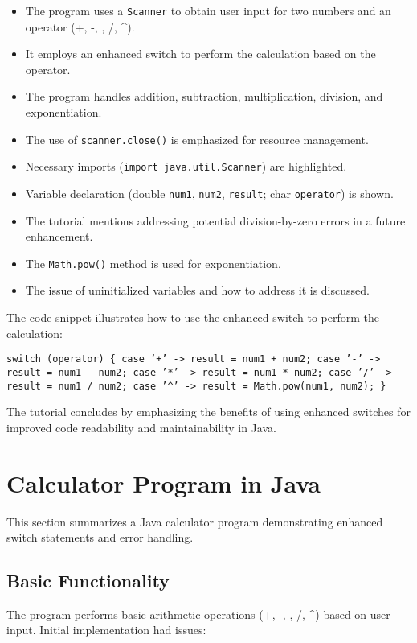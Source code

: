 \documentclass{article}
\begin{document}
\begin{itemize}
    \item The program uses a \texttt{Scanner} to obtain user input for two numbers and an operator (+, -, \*, /, \textasciicircum{}).
    \item It employs an enhanced switch to perform the calculation based on the operator.
    \item The program handles addition, subtraction, multiplication, division, and exponentiation.
    \item  The use of \texttt{scanner.close()} is emphasized for resource management.
    \item Necessary imports (\texttt{import java.util.Scanner}) are highlighted.
    \item Variable declaration (double \texttt{num1}, \texttt{num2}, \texttt{result}; char \texttt{operator}) is shown.
    \item The tutorial mentions addressing potential division-by-zero errors in a future enhancement.
    \item  The \texttt{Math.pow()} method is used for exponentiation.
    \item The issue of uninitialized variables and how to address it is discussed.
\end{itemize}

The code snippet illustrates how to use the enhanced switch to perform the calculation:

\texttt{switch (operator) \{
    case '+' -> result = num1 + num2;
    case '-' -> result = num1 - num2;
    case '*' -> result = num1 * num2;
    case '/' -> result = num1 / num2;
    case '\textasciicircum{}' -> result = Math.pow(num1, num2);
\}}


The tutorial concludes by emphasizing the benefits of using enhanced switches for improved code readability and maintainability in Java.


\section{Calculator Program in Java}

This section summarizes a Java calculator program demonstrating enhanced switch statements and error handling.

\subsection{Basic Functionality}

The program performs basic arithmetic operations (+, -, \*, /, \^{}) based on user input.  Initial implementation had issues:
\end{document}
